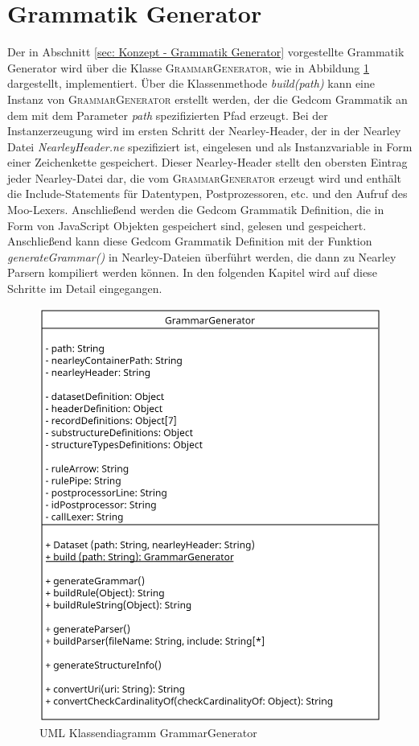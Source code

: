 \section{Grammatik Generator}
\label{sec: Implementierung - Grammatik Generator}
Der in Abschnitt \ref{sec: Konzept - Grammatik Generator} vorgestellte Grammatik Generator wird über die Klasse \textsc{GrammarGenerator}, wie in Abbildung \ref{fig: UML Klassendiagramm GrammarGenerator} dargestellt, implementiert. Über die Klassenmethode \textit{build(path)} kann eine Instanz von \textsc{GrammarGenerator} erstellt werden, der die Gedcom Grammatik an dem mit dem Parameter \textit{path} spezifizierten Pfad erzeugt. Bei der Instanzerzeugung wird im ersten Schritt der Nearley-Header, der in der Nearley Datei \textit{NearleyHeader.ne} spezifiziert ist, eingelesen und als Instanzvariable in Form einer Zeichenkette gespeichert. Dieser Nearley-Header stellt den obersten Eintrag jeder Nearley-Datei dar, die vom \textsc{GrammarGenerator} erzeugt wird und enthält die Include-Statements für Datentypen, Postprozessoren, etc. und den Aufruf des Moo-Lexers. Anschließend werden die Gedcom Grammatik Definition, die in Form von JavaScript Objekten gespeichert sind, gelesen und gespeichert. Anschließend kann diese Gedcom Grammatik Definition mit der Funktion \textit{generateGrammar()} in Nearley-Dateien überführt werden, die dann zu Nearley Parsern kompiliert werden können. In den folgenden Kapitel wird auf diese Schritte im Detail eingegangen.
\begin{figure}[h]
	\centering
	\includegraphics[width=1\textwidth]{images/UML_Class_GrammarGenerator.png}
	\caption{UML Klassendiagramm GrammarGenerator}
	\label{fig: UML Klassendiagramm GrammarGenerator}
\end{figure}

